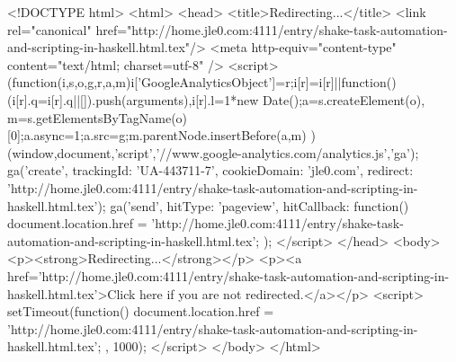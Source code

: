 <!DOCTYPE html>
<html>
<head>
<title>Redirecting...</title>
<link rel="canonical" href="http://home.jle0.com:4111/entry/shake-task-automation-and-scripting-in-haskell.html.tex"/>
<meta http-equiv="content-type" content="text/html; charset=utf-8" />
<script>
(function(i,s,o,g,r,a,m){i['GoogleAnalyticsObject']=r;i[r]=i[r]||function(){
(i[r].q=i[r].q||[]).push(arguments)},i[r].l=1*new Date();a=s.createElement(o),
m=s.getElementsByTagName(o)[0];a.async=1;a.src=g;m.parentNode.insertBefore(a,m)
})(window,document,'script','//www.google-analytics.com/analytics.js','ga');
ga('create', { trackingId: 'UA-443711-7', cookieDomain: 'jle0.com', redirect: 'http://home.jle0.com:4111/entry/shake-task-automation-and-scripting-in-haskell.html.tex'});
ga('send', { hitType: 'pageview', hitCallback: function() { document.location.href = 'http://home.jle0.com:4111/entry/shake-task-automation-and-scripting-in-haskell.html.tex'; } });
</script>
</head>
<body>
  <p><strong>Redirecting...</strong></p>
  <p><a href='http://home.jle0.com:4111/entry/shake-task-automation-and-scripting-in-haskell.html.tex'>Click here if you are not redirected.</a></p>
  <script>
    setTimeout(function() { document.location.href = 'http://home.jle0.com:4111/entry/shake-task-automation-and-scripting-in-haskell.html.tex'; }, 1000);
  </script>
</body>
</html>
